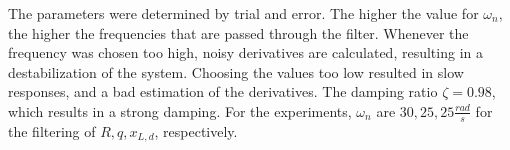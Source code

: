 The parameters were determined by trial and error. 
The higher the value for $ \omega_n $, the higher the frequencies that are passed through the filter. 
Whenever the frequency was chosen too high, noisy derivatives are calculated, resulting in a destabilization of the system.
Choosing the values too low resulted in slow responses, and a bad estimation of the derivatives.
The damping ratio $ \zeta =0.98$, which results in a strong damping. 
For the experiments, $ \omega_n $ are $ 30,25,25 \frac{rad}{s}$ for the filtering of $ R,q,x_{L,d} $, respectively. 
\clearpage


%
%


